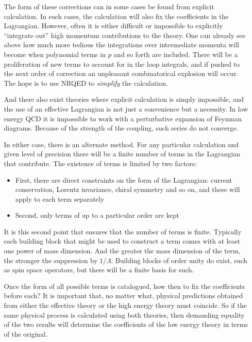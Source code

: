 The form of these corrections can in some cases be found from explicit calculation.  In such cases, the calculation will also fix the coefficients in the Lagrangian.  However, often it is either difficult or impossible to explicitly ``integrate out'' high momentum contributions to the theory.  One can already see above how much more tedious the integrations over intermediate momenta will become when polynomial terms in $p$ and so forth are included.  There will be a proliferation of new terms to account for in the loop integrals, and if pushed to the next order of correction an unpleasant combinatorical explosion will occur.  The hope is to use NRQED to {\it simplify} the calculation.

And there also exist theories where explicit calculation is simply impossible, and the use of an effective Lagrangian is not just a convenience but a necessity.  In low energy QCD it is impossible to work with a perturbative expansion of Feynman diagrams.  Because of the strength of the coupling, such series do not converge.

In either case, there is an alternate method.  For any particular calculation and given level of precision there will be a finite number of terms in the Lagrangian that contribute.  The existence of terms is limited by two factors:
\begin{itemize}
  \item First, there are direct constraints on the form of the Lagrangian:  current conservation, Lorentz invariance, chiral symmetry and so on, and these will apply to each term separately
  \item Second, only terms of up to a particular order are kept
\end{itemize}
It is this second point that ensures that the number of terms is finite.  Typically each building block that might be used to construct a term comes with at least one power of mass dimension.  And the greater the mass dimension of the term, the stronger the suppression by $1/\Lambda$.  Building blocks of order unity do exist, such as spin space operators, but there will be a finite basis for such.

Once the form of all possible terms is catalogued, how then to fix the coefficients before each?  It is important that, no matter what, physical predictions obtained from either the effective theory or the high energy theory must coincide.  So if the same physical process is calculated using both theories, then demanding equality of the two results will determine the coefficients of the low energy theory in terms of the original.

